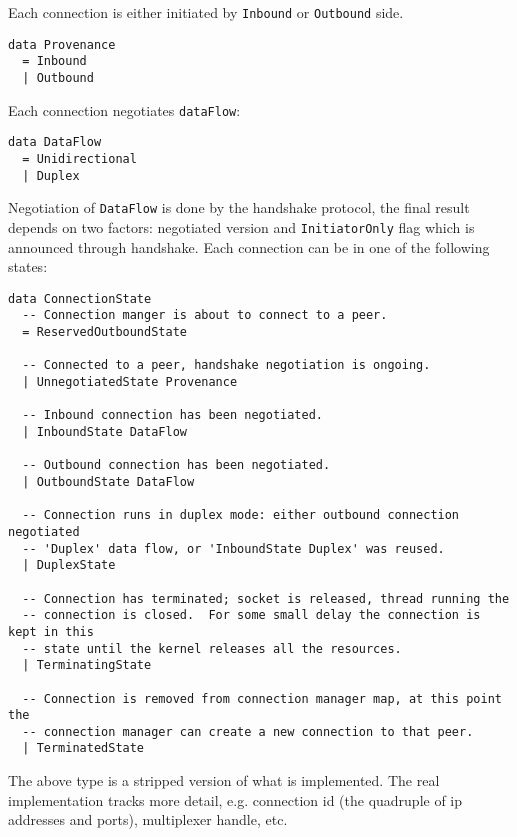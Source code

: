 \documentclass{article}
\begin{document}
Each connection is either initiated by \texttt{Inbound} or \texttt{Outbound} side.
\begin{lstlisting}
data Provenance
  = Inbound
  | Outbound
\end{lstlisting}
Each connection negotiates \texttt{dataFlow}:
\begin{lstlisting}
data DataFlow
  = Unidirectional
  | Duplex
\end{lstlisting}
Negotiation of \texttt{DataFlow} is done by the handshake protocol, the final
result depends on two factors: negotiated version and \texttt{InitiatorOnly}
flag which is announced through handshake.  Each connection can be in one
of the following states:
\begin{lstlisting}
data ConnectionState
  -- Connection manger is about to connect to a peer.
  = ReservedOutboundState

  -- Connected to a peer, handshake negotiation is ongoing.
  | UnnegotiatedState Provenance

  -- Inbound connection has been negotiated.
  | InboundState DataFlow

  -- Outbound connection has been negotiated.
  | OutboundState DataFlow

  -- Connection runs in duplex mode: either outbound connection negotiated
  -- 'Duplex' data flow, or 'InboundState Duplex' was reused.
  | DuplexState

  -- Connection has terminated; socket is released, thread running the
  -- connection is closed.  For some small delay the connection is kept in this
  -- state until the kernel releases all the resources.
  | TerminatingState

  -- Connection is removed from connection manager map, at this point the
  -- connection manager can create a new connection to that peer.
  | TerminatedState
\end{lstlisting}
The above type is a stripped version of what is implemented.  The real
implementation tracks more detail, e.g. connection id (the quadruple of ip
addresses and ports), multiplexer handle, etc.
\end{document}
